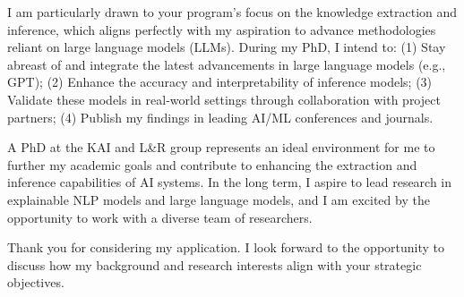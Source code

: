 \documentclass[10pt,a4paper,roman]{moderncv}
\begin{document}
I am particularly drawn to your program's focus on the knowledge extraction and inference, 
which aligns perfectly with my aspiration to advance methodologies reliant on large language models (LLMs). 
During my PhD, I intend to: 
(1) Stay abreast of and integrate the latest advancements in large language models (e.g., GPT); 
(2) Enhance the accuracy and interpretability of inference models; 
(3) Validate these models in real-world settings through collaboration with project partners; 
(4) Publish my findings in leading AI/ML conferences and journals.

A PhD at the KAI and L\&R group represents an ideal environment for me to further my academic goals and 
contribute to enhancing the extraction and inference capabilities of AI systems. 
In the long term, I aspire to lead research in explainable NLP models and large language models, 
and I am excited by the opportunity to work with a diverse team of researchers.

Thank you for considering my application. 
I look forward to the opportunity to discuss how my background and research interests align with your strategic objectives.


\makeletterclosing
\end{document}
